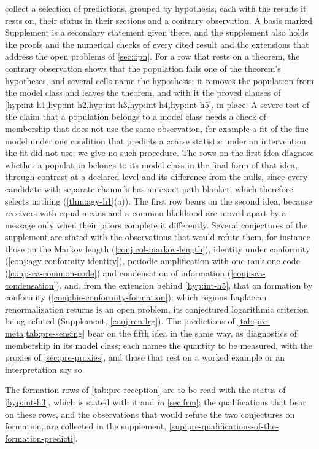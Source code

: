  collect a selection of predictions, grouped by hypothesis, each with the results it rests on, their status in their sections and a contrary observation. A basis marked Supplement is a secondary statement given there, and the supplement also holds the proofs and the numerical checks of every cited result and the extensions that address the open problems of \cref{sec:opn}. For a row that rests on a theorem, the contrary observation shows that the population fails one of the theorem's hypotheses, and several cells name the hypothesis: it removes the population from the model class and leaves the theorem, and with it the proved clauses of \cref{hyp:int-h1,hyp:int-h2,hyp:int-h3,hyp:int-h4,hyp:int-h5}, in place. A severe test of the claim that a population belongs to a model class needs a check of membership that does not use the same observation, for example a fit of the fine model under one condition that predicts a coarse statistic under an intervention the fit did not use; we give no such procedure. The rows on the first idea diagnose whether a population belongs to its model class in the final form of that idea, through contrast at a declared level and its difference from the nulls, since every candidate with separate channels has an exact path blanket, which therefore selects nothing (\cref{thm:agy-h1}(a)). The first row bears on the second idea, because receivers with equal means and a common likelihood are moved apart by a message only when their priors complete it differently. Several conjectures of the supplement are stated with the observations that would refute them, for instance those on the Markov length (\cref{conj:col-markov-length}), identity under conformity (\cref{conj:agy-conformity-identity}), periodic amplification with one rank-one code (\cref{conj:sca-common-code}) and condensation of information (\cref{conj:sca-condensation}), and, from the extension behind \cref{hyp:int-h5}, that on formation by conformity (\cref{conj:hie-conformity-formation}); which regions Laplacian renormalization returns is an open problem, its conjectured logarithmic criterion being refuted (Supplement, \cref{conj:ren-lrg}). The predictions of \cref{tab:pre-meta,tab:pre-sensing} bear on the fifth idea in the same way, as diagnostics of membership in its model class; each names the quantity to be measured, with the proxies of \cref{sec:pre-proxies}, and those that rest on a worked example or an interpretation say so.

The formation rows of \cref{tab:pre-reception} are to be read with the status of \cref{hyp:int-h3}, which is stated with it and in \cref{sec:frm}; the qualifications that bear on these rows, and the observations that would refute the two conjectures on formation, are collected in the supplement, \cref{sup:pre-qualifications-of-the-formation-predicti}.

